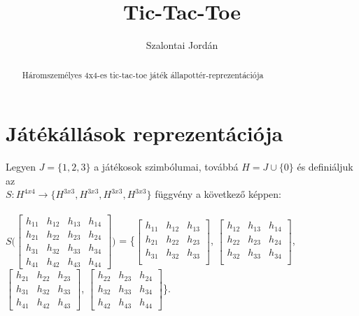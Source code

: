 \documentclass[fleqn]{article}
\begin{document}
\title{Tic-Tac-Toe}
\author{Szalontai Jordán}

\maketitle

\begin{abstract}
Háromszemélyes 4x4-es tic-tac-toe játék állapottér-reprezentációja
\end{abstract}

\section{Játékállások reprezentációja}
Legyen $J = \{1, 2, 3\}$ a játékosok szimbólumai, továbbá $H = J \cup \{ 0 \}$ és definiáljuk az\\$S: H^{4x4} \rightarrow \{H^{3x3},H^{3x3},H^{3x3},H^{3x3}\}$ függvény a következő képpen:
\\\\
$S\Bigg(\begin{bmatrix}
	h_{11} & h_{12} & h_{13} & h_{14} \\
	h_{21} & h_{22} & h_{23} & h_{24} \\
	h_{31} & h_{32} & h_{33} & h_{34} \\
	h_{41} & h_{42} & h_{43} & h_{44}
\end{bmatrix}\Bigg)$ = 
\Bigg\{$\begin{bmatrix}
	h_{11} & h_{12} & h_{13}\\
	h_{21} & h_{22} & h_{23}\\
	h_{31} & h_{32} & h_{33}\\
\end{bmatrix}$,
$\begin{bmatrix}
	h_{12} & h_{13} & h_{14} \\
	h_{22} & h_{23} & h_{24} \\
	h_{32} & h_{33} & h_{34} \\
\end{bmatrix}$,
$\begin{bmatrix}
	h_{21} & h_{22} & h_{23} \\
	h_{31} & h_{32} & h_{33} \\
	h_{41} & h_{42} & h_{43}
\end{bmatrix}$,
$\begin{bmatrix}
	h_{22} & h_{23} & h_{24} \\
	h_{32} & h_{33} & h_{34} \\
	h_{42} & h_{43} & h_{44}
\end{bmatrix}$\Bigg\}.
\end{document}
